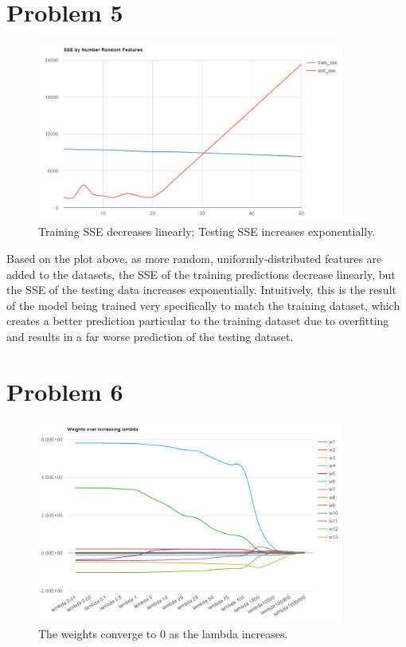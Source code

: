 \documentclass[journal]{IEEEtran}
\begin{document}
\section{Problem 5}
\begin{figure}[!h]
\centering
\captionsetup{justification=centering,margin=2cm}
\includegraphics[width=0.9\textwidth]{sse_rand_features.PNG}
\caption{\label{fig:sse}Training SSE decreases linearly; Testing SSE increases exponentially.}
\end{figure}
\smallskip
\noindent Based on the plot above, as more random, uniformly-distributed features
are added to the datasets, the SSE of the training predictions decrease linearly,
but the SSE of the testing data increases exponentially. Intuitively, this is the
result of the model being trained very specifically to match the training dataset,
which creates a better prediction particular to the training dataset due to overfitting
and results in a far worse prediction of the testing dataset. \newline
\medskip

\section{Problem 6}
\begin{figure}[!h]
\centering
\captionsetup{justification=centering,margin=2cm}
\includegraphics[width=0.9\textwidth]{weights_lambda.PNG}
\caption{\label{fig:lambdas}The weights converge to 0 as the lambda increases.}
\end{figure}
\smallskip
\noindent 
\medskip
\end{document}
